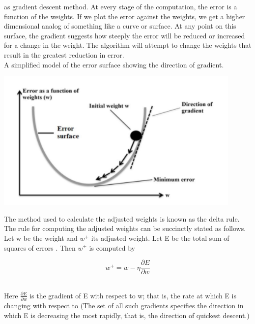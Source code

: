 as gradient descent method. At every stage of the computation, the error is a
function of the weights. If we plot the error against the weights, we get a higher
dimensional analog of something like a curve or surface. At any point on this surface,
the gradient suggests how steeply the error will be reduced or increased for a change
in the weight. The algorithm will attempt to change the weights that result in the
greatest reduction in error.
\\
A simplified model of the error surface showing the direction of gradient.
\begin{center}
    \includegraphics[width=.8\textwidth]{Images/A22_img3.png}
\end{center}

The method used to calculate the adjusted weights is known as the delta rule.
\\
The rule for computing the adjusted weights can be succinctly stated as follows. Let w be the weight and $w^+$ its adjusted weight. Let E be the total sum of squares of errors . Then $w^+$ is computed by 
\begin{center}
  \[ w^+ = w-\eta\frac{\partial E}{\partial w}
\]  
\end{center}
\\
Here $\frac{\partial E}{\partial w}$ is the gradient of E with respect to w; that is, the rate at which E is changing with respect to (The set of all such gradients specifies the direction in which E is decreasing the most rapidly, that is, the direction of quickest descent.)